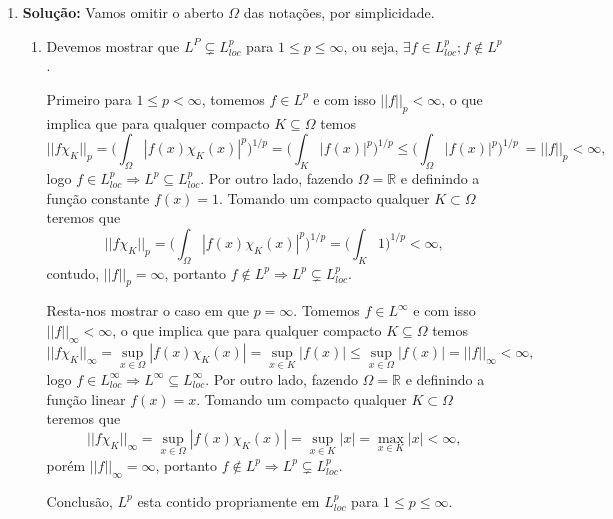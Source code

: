 \documentclass{article}
\begin{document}
\begin{enumerate}
		\item \textbf{Solução:} Vamos omitir o aberto $\Omega$ das notações, por simplicidade.
		\begin{enumerate}
			\item Devemos mostrar que $L^{P} \subsetneq L^{p}_{loc}$ para $1 \leq p \leq \infty$, ou seja, $\exists f \in L^{p}_{loc}; f \notin L^{p}$. 
			
			Primeiro para $1 \leq p < \infty$, tomemos $f \in L^{p}$ e com isso $||f||_{p} < \infty$, o que implica que para qualquer compacto $K \subseteq \Omega$ temos 
			$$
			||f\chi_{K}||_{p} = \Big( \int_{\Omega}|f(x)\chi_{K} (x)|^{p} \Big)^{1/p}= \Big( \int_{K}|f(x)|^{p} \Big)^{1/p} \leq \Big( \int_{\Omega}|f(x)|^{p} \Big)^{1/p} \ = ||f||_{p} < \infty,
			$$
			logo $f \in L^{p}_{loc} \Rightarrow L^{p} \subseteq L^{p}_{loc}$. Por outro lado, fazendo $\Omega = \mathbb{R}$ e definindo a função constante $f(x) = 1$. Tomando um compacto qualquer $K \subset \Omega$ teremos que 
			$$
			||f \chi_{K}||_{p} = \Big( \int_{\Omega} |f(x)\chi_{K}(x)|^{p} \Big)^{1/p} = \Big( \int_{K} 1 \Big)^{1/p} < \infty,
			$$
			contudo, 
			$||f||_{p} = \infty$, portanto $f \notin L^{p} \Rightarrow L^{p} \subsetneq L^{p}_{loc}$.
			
			Resta-nos mostrar o caso em que $p=\infty$. Tomemos $f \in L^{\infty}$ e com isso $||f||_{\infty} < \infty$, o que implica que para qualquer compacto $K \subseteq \Omega$ temos 
			$$
			||f\chi_{K}||_{\infty} = \sup_{x \in \Omega}|f(x)\chi_{K} (x)|= \sup_{x \in K}|f(x)| \leq \sup_{x \in \Omega}|f(x)| = ||f||_{\infty} < \infty,
			$$
			logo $f \in L^{\infty}_{loc} \Rightarrow L^{\infty} \subseteq L^{\infty}_{loc}$. Por outro lado, fazendo $\Omega = \mathbb{R}$ e definindo a função linear $f(x) = x$. Tomando um compacto qualquer $K \subset \Omega$ teremos que 
			$$
			||f \chi_{K}||_{\infty} = \sup_{x \in \Omega}|f(x)\chi_{K} (x)| = \sup_{x \in K}|x| = \max_{x \in K}|x| < \infty,
			$$
			porém $||f||_{\infty} = \infty$, portanto $f \notin L^{p} \Rightarrow L^{p} \subsetneq L^{p}_{loc}$.
			
			Conclusão, $L^{p}$ esta contido propriamente em $L^{p}_{loc}$ para $1 \leq p \leq \infty$.
			

\end{enumerate}
\end{enumerate}
\end{document}
